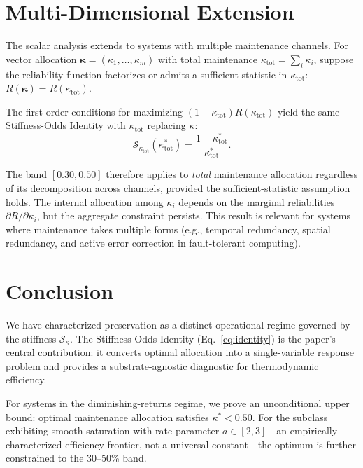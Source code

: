 \documentclass[11pt,twocolumn]{article}
\begin{document}
\section{Multi-Dimensional Extension}
\label{sec:multidim}

The scalar analysis extends to systems with multiple maintenance channels. For vector allocation $\bm{\kappa} = (\kappa_1, \ldots, \kappa_m)$ with total maintenance $\kappa_{\mathrm{tot}} = \sum_i \kappa_i$, suppose the reliability function factorizes or admits a sufficient statistic in $\kappa_{\mathrm{tot}}$: $R(\bm{\kappa}) = R(\kappa_{\mathrm{tot}})$.

The first-order conditions for maximizing $(1 - \kappa_{\mathrm{tot}})R(\kappa_{\mathrm{tot}})$ yield the same Stiffness-Odds Identity with $\kappa_{\mathrm{tot}}$ replacing $\kappa$:
\begin{equation}
\mathcal{S}_{\kappa_{\mathrm{tot}}}(\kappa^*_{\mathrm{tot}}) = \frac{1 - \kappa^*_{\mathrm{tot}}}{\kappa^*_{\mathrm{tot}}}.
\label{eq:multidim_identity}
\end{equation}

The band $[0.30, 0.50]$ therefore applies to \emph{total} maintenance allocation regardless of its decomposition across channels, provided the sufficient-statistic assumption holds. The internal allocation among $\kappa_i$ depends on the marginal reliabilities $\partial R / \partial \kappa_i$, but the aggregate constraint persists. This result is relevant for systems where maintenance takes multiple forms (e.g., temporal redundancy, spatial redundancy, and active error correction in fault-tolerant computing).

\section{Conclusion}

We have characterized preservation as a distinct operational regime governed by the stiffness $\mathcal{S}_\kappa$. The Stiffness-Odds Identity (Eq.~\ref{eq:identity}) is the paper's central contribution: it converts optimal allocation into a single-variable response problem and provides a substrate-agnostic diagnostic for thermodynamic efficiency.

For systems in the diminishing-returns regime, we prove an unconditional upper bound: optimal maintenance allocation satisfies $\kappa^* < 0.50$. For the subclass exhibiting smooth saturation with rate parameter $a \in [2,3]$---an empirically characterized efficiency frontier, not a universal constant---the optimum is further constrained to the 30--50\% band.
\end{document}
